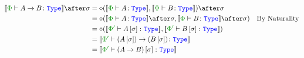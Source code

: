 {
\begin{align}
    \deno{\typerelation{\P}{\ab}{\type}}\after\si &= \diamond(\deno{\typerelation{\P}{A}{\type}},\deno{\typerelation{\P}{B}{\type}})\after\si\\
    &= \diamond(\deno{\typerelation{\P}{A}{\type}}\after\si,\deno{\typerelation{\P}{B}{\type}}\after\si)\qt{By Naturality}\\
    & = \diamond(\deno{\typerelation{\P'}{A\ssi}{\type}},\deno{\typerelation{\P'}{B\ssi}{\type}})\\
    & = \deno{\typerelation{\P'}{\fntype{(A\ssi)}{(B\ssi)}}{\type}}\\
    & = \deno{\typerelation{\P'}{(\ab)\ssi}{\type}}\\
\end{align}
}

\newcommand\effectSubstitutionSubtyping[1]{
    If $\si = \deno{\typerelation{\P'}{\si}{\P}}$ then $\deno{A\ssi\subtypepp B\ssi} = \si\star\deno{A\subtypep B}: #1(A, B)$.

\proof
By induction on the derivation on $\deno{A\subtypep B}$. Using S-closure of $\si\star$ 

\case{Ground}
\begin{align}
    \si\star(\g_1\subtypeg\g_2) &= (\g_1\subtypeg\g_2)
\end{align}

Since $\si\star$ is s-closed.

\case{Monad}
\begin{align}
    \si\star\deno{\M{\e_1}{A} \subtypep \M{\e_2}{B}} & = \si\star(\deno{\e_1\subeffectp\e_2})\after\si\star(\T{\e_1}(\deno{A\subtypep B})) \\ 
     &= \deno{\si(\e_1)\subeffectpp\si(\e_2)} \after \T{\si(\e_1)}{\deno{A\ssi\subtypepp B\ssi}}\qt{By S-Closure}\\
     &= \deno{\M{\si(\e_1)}{A\ssi}\subtypepp\M{\si(\e_2)}{B\ssi}}\\
     &= \deno{(\M{\e_1}{A})\ssi\subtypepp\M{\e_2}{B}\ssi}\\
\end{align}

\case{For All}
    \begin{align}
        \si\star\deno{\all{\a}{A}\subtypep\all{\a}{B}} &= \si\star(\allI(\deno{A\subtypepa B})) \\
        &=\allII((\si\times\Id{U})\star(\deno{A\subtypepa B}))\\
        &=\allII(\deno{A\sub{\si,\a\setto\a}\subtypeppa B\sub{\si,\a\setto\a}})\\
        &= \deno{(\all{\a}{A})\ssi \subtypepp(\all{\a}{B})\ssi}\\
    \end{align}

}
